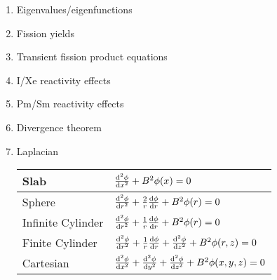 \documentclass{school-22.211-notes}
\begin{document}
\begin{enumerate}
\item Eigenvalues/eigenfunctions
\item Fission yields
\item Transient fission product equations
\item I/Xe reactivity effects
\item Pm/Sm reactivity effects
\item Divergence theorem
\item Laplacian 
\begin{table}[ht]
  \centering
  \begin{tabular}{|l|l|} \hline
    Slab & $\frac{\mathrm{d}^{2}\phi}{\mathrm{d}x^{2}} + B^2 \phi(x) = 0$ \\ \hline
    Sphere & $\frac{\mathrm{d}^{2}\phi}{\mathrm{d}r^{2}} + \frac{2}{r} \frac{\mathrm{d}\phi}{\mathrm{d}r} + B^2 \phi(r) = 0$ \\ \hline
    Infinite Cylinder & $\frac{\mathrm{d}^{2}\phi}{\mathrm{d}r^{2}} + \frac{1}{r} \frac{\mathrm{d}\phi}{\mathrm{d}r} + B^2 \phi(r) = 0$ \\ \hline
    Finite Cylinder & $\frac{\mathrm{d}^{2}\phi}{\mathrm{d}r^{2}} + \frac{1}{r} \frac{\mathrm{d}\phi}{\mathrm{d}r} + \frac{\mathrm{d}^{2}\phi}{\mathrm{d}z^{2}} + B^2 \phi(r,z) = 0$ \\ \hline
    Cartesian & $\frac{\mathrm{d}^{2}\phi}{\mathrm{d}x^{2}} + \frac{\mathrm{d}^{2}\phi}{\mathrm{d}y^{2}} + \frac{\mathrm{d}^{2}\phi}{\mathrm{d}z^{2}} + B^2 \phi(x,y,z) = 0$ \\ \hline
  \end{tabular}
\end{table}

\end{enumerate}
\end{document}

